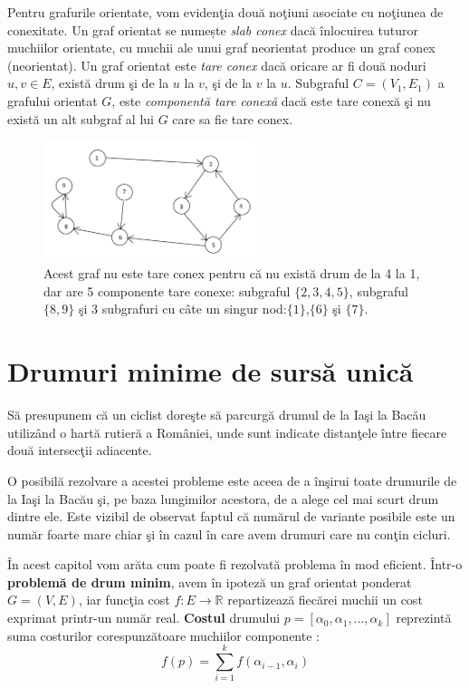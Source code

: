\documentclass[11pt,a4paper]{report}
\newcommand{\R}{\mathbb{R}}
\begin{document}
    Pentru grafurile orientate, vom eviden\c tia dou\u a no\c tiuni asociate cu no\c tiunea de conexitate. 
    Un graf orientat se numește \textit{slab conex} \cite{AM} dacă înlocuirea tuturor muchiilor orientate, cu muchii ale unui graf neorientat produce un graf conex (neorientat). Un graf orientat este \textit{tare conex} \cite{AM} dac\u a oricare ar fi dou\u a noduri $u,v\in E$, exist\u a drum \c si de la $u$ la $v$, \c si de la $v$ la $u$. Subgraful $C=(V_1,E_1)$ a grafului orientat $G$, este \textit{component\u a tare conex\u a} dac\u a este tare conex\u a \c si nu exist\u a un alt subgraf al lui $G$ care sa fie tare conex.
        \begin{figure}[!hbt]
    	\centering
    	\includegraphics[width=6.2cm]{Conex.png}
    	\caption{Acest graf nu este tare conex pentru c\u a nu exist\u a drum de la 4 la 1, dar are 5 componente tare conexe: subgraful $\{2,3,4,5\}$, subgraful $\{8,9\}$ \c si 3 subgrafuri cu c\^ ate un singur nod:$\{1\}$,$\{6\}$ \c si $\{7\}$. }
    \end{figure}
    
    
    \chapter{Drumuri minime de surs\u a unic\u a}

    
    S\u a presupunem c\u a un ciclist dore\c ste s\u a parcurg\u a drumul de la Ia\c si la Bac\u au  utiliz\^and o hart\u a rutier\u a a Rom\^ aniei, unde sunt indicate distan\c tele \^ intre fiecare dou\u a intersec\c tii adiacente.
    
    O posibil\u a rezolvare a acestei probleme este aceea de a \^ in\c sirui toate drumurile de la Ia\c si la Bac\u au \c si, pe baza lungimilor acestora, de a alege cel mai scurt drum dintre ele. Este vizibil de observat faptul c\u a num\u arul de variante posibile este un num\u ar foarte mare chiar \c si \^ in cazul \^ in care avem drumuri care nu con\c tin cicluri.
    
    \^ In acest capitol vom ar\u ata cum poate fi rezolvat\u a problema \^ in mod eficient. \^ Intr-o \textbf{problem\u a de drum minim}, avem \^ in ipotez\u a un graf orientat ponderat $G=(V,E)$, iar func\c tia cost $f:E \longrightarrow \R $ repartizeaz\u a fiec\u arei muchii un cost exprimat printr-un num\u ar real. \textbf{Costul} drumului  $p=[ \alpha_{0},\alpha_{1},...,\alpha_{k}]$ reprezint\u a suma costurilor corespunz\u atoare muchiilor componente :
    \begin{equation*}
    f(p)=\sum\limits_{i=1}^{k} f(\alpha_{i-1},\alpha_{i})
    \end{equation*}
    
\end{document}

